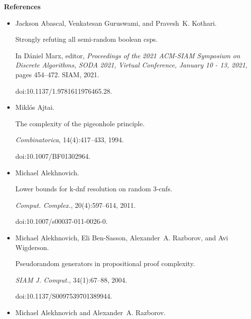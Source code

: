 \documentclass[10pt,a4paper]{article}
\begin{document}
\par\medskip\noindent\textbf{References}\par



\begin{itemize}


\item[] 
[1]

Jackson Abascal, Venkatesan Guruswami, and Pravesh K. Kothari.


Strongly refuting all semi-random boolean csps.


In Dániel Marx, editor, \emph{Proceedings of the 2021 ACM-SIAM
Symposium on Discrete Algorithms, SODA 2021, Virtual Conference, January 10
- 13, 2021}, pages 454–472. SIAM, 2021.


doi:10.1137/1.9781611976465.28.





\item[] 
[2]

Miklós Ajtai.


The complexity of the pigeonhole principle.


\emph{Combinatorica}, 14(4):417–433, 1994.


doi:10.1007/BF01302964.





\item[] 
[3]

Michael Alekhnovich.


Lower bounds for k-dnf resolution on random 3-cnfs.


\emph{Comput. Complex.}, 20(4):597–614, 2011.


doi:10.1007/s00037-011-0026-0.





\item[] 
[4]

Michael Alekhnovich, Eli Ben-Sasson, Alexander A. Razborov, and Avi Wigderson.


Pseudorandom generators in propositional proof complexity.


\emph{SIAM J. Comput.}, 34(1):67–88, 2004.


doi:10.1137/S0097539701389944.





\item[] 
[5]

Michael Alekhnovich and Alexander A. Razborov.



\end{itemize}
\end{document}
